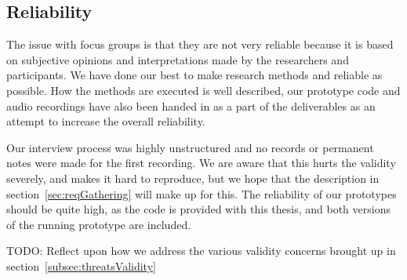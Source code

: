 \subsection{Reliability}
The issue with focus groups is that they are not very reliable because it is based on subjective opinions and interpretations made by the researchers and participants. We have done our best to make research methods and reliable as possible. How the methods are executed is well described, our prototype code and audio recordings have also been handed in as a part of the deliverables as an attempt to increase the overall reliability.

Our interview process was highly unstructured and no records or permanent notes were made for the first recording. We are aware that this hurts the validity severely, and makes it hard to reproduce, but we hope that the description in section~\ref{sec:reqGathering} will make up for this. The reliability of our prototypes should be quite high, as the code is provided with this thesis, and both versions of the running prototype are included.


TODO: Reflect upon how we address the various validity concerns brought up in section~\ref{subsec:threatsValidity}
